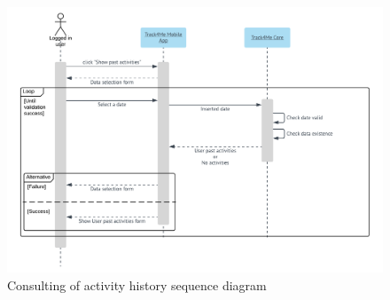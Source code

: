 \begin{figure}[H]
  \includegraphics[width=\textwidth,height=\textheight,keepaspectratio]{assets/sequence/ConsultingOfActivityHistory.pdf}
  \caption{Consulting of activity history sequence diagram}
  \label{fig:ConsultingOfActivityHistory}
\end{figure}










